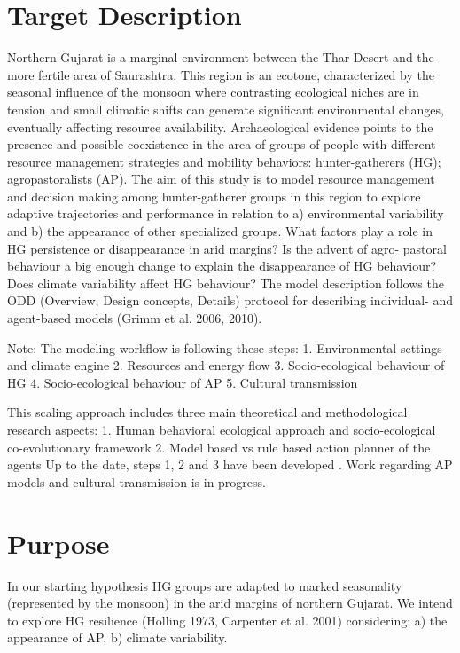 \section{Target Description}



Northern Gujarat is a marginal environment between the Thar Desert and the more fertile area of
Saurashtra. This region is an ecotone, characterized by the seasonal influence of the monsoon where
contrasting ecological niches are in tension and small climatic shifts can generate significant
environmental changes, eventually affecting resource availability. Archaeological evidence points to
the presence and possible coexistence in the area of groups of people with different resource
management strategies and mobility behaviors: hunter-gatherers (HG); agropastoralists (AP).
The aim of this study is to model resource management and decision making among hunter-gatherer
groups in this region to explore adaptive trajectories and performance in relation to a) environmental
variability and b) the appearance of other specialized groups.
What factors play a role in HG persistence or disappearance in arid margins? Is the advent of agro-
pastoral behaviour a big enough change to explain the disappearance of HG behaviour? Does climate
variability affect HG behaviour?
The model description follows the ODD (Overview, Design concepts, Details) protocol for describing
individual- and agent-based models (Grimm et al. 2006, 2010).

Note:
The modeling workflow is following these steps:
1. Environmental settings and climate engine
2. Resources and energy flow
3. Socio-ecological behaviour of HG
4. Socio-ecological behaviour of AP
5. Cultural transmission

This scaling approach includes three main theoretical and methodological research aspects:
1. Human behavioral ecological approach and socio-ecological co-evolutionary framework
2. Model based vs rule based action planner of the agents
Up to the date, steps 1, 2 and 3 have been developed . Work regarding AP models and cultural
transmission is in progress.


\section{Purpose}
In our starting hypothesis HG groups are adapted to marked seasonality (represented by the
monsoon) in the arid margins of northern Gujarat. We intend to explore HG resilience (Holling 1973,
Carpenter et al. 2001) considering: a) the appearance of AP, b) climate variability.

